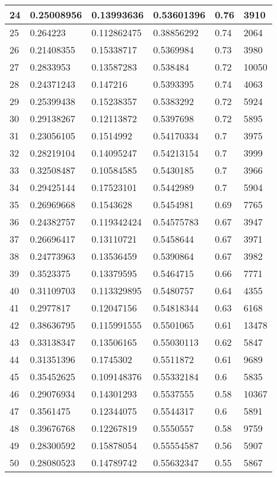 \begin{longtable}{|l|l|l|l|l|l|}
24 & 0.25008956 & 0.13993636 & 0.53601396 & 0.76 & 3910 \\ \hline 
25 & 0.264223 & 0.112862475 & 0.38856292 & 0.74 & 2064 \\ \hline 
26 & 0.21408355 & 0.15338717 & 0.5369984 & 0.73 & 3980 \\ \hline 
27 & 0.2833953 & 0.13587283 & 0.538484 & 0.72 & 10050 \\ \hline 
28 & 0.24371243 & 0.147216 & 0.5393395 & 0.74 & 4063 \\ \hline 
29 & 0.25399438 & 0.15238357 & 0.5383292 & 0.72 & 5924 \\ \hline 
30 & 0.29138267 & 0.12113872 & 0.5397698 & 0.72 & 5895 \\ \hline 
31 & 0.23056105 & 0.1514992 & 0.54170334 & 0.7 & 3975 \\ \hline 
32 & 0.28219104 & 0.14095247 & 0.54213154 & 0.7 & 3999 \\ \hline 
33 & 0.32508487 & 0.10584585 & 0.5430185 & 0.7 & 3966 \\ \hline 
34 & 0.29425144 & 0.17523101 & 0.5442989 & 0.7 & 5904 \\ \hline 
35 & 0.26969668 & 0.1543628 & 0.5454981 & 0.69 & 7765 \\ \hline 
36 & 0.24382757 & 0.119342424 & 0.54575783 & 0.67 & 3947 \\ \hline 
37 & 0.26696417 & 0.13110721 & 0.5458644 & 0.67 & 3971 \\ \hline 
38 & 0.24773963 & 0.13536459 & 0.5390864 & 0.67 & 3982 \\ \hline 
39 & 0.3523375 & 0.13379595 & 0.5464715 & 0.66 & 7771 \\ \hline 
40 & 0.31109703 & 0.113329895 & 0.5480757 & 0.64 & 4355 \\ \hline 
41 & 0.2977817 & 0.12047156 & 0.54818344 & 0.63 & 6168 \\ \hline 
42 & 0.38636795 & 0.115991555 & 0.5501065 & 0.61 & 13478 \\ \hline 
43 & 0.33138347 & 0.13506165 & 0.55030113 & 0.62 & 5847 \\ \hline 
44 & 0.31351396 & 0.1745302 & 0.5511872 & 0.61 & 9689 \\ \hline 
45 & 0.35452625 & 0.109148376 & 0.55332184 & 0.6 & 5835 \\ \hline 
46 & 0.29076934 & 0.14301293 & 0.5537555 & 0.58 & 10367 \\ \hline 
47 & 0.3561475 & 0.12344075 & 0.5544317 & 0.6 & 5891 \\ \hline 
48 & 0.39676768 & 0.12267819 & 0.5550557 & 0.58 & 9759 \\ \hline 
49 & 0.28300592 & 0.15878054 & 0.55554587 & 0.56 & 5907 \\ \hline 
50 & 0.28080523 & 0.14789742 & 0.55632347 & 0.55 & 5867 \\ \hline 
\end{longtable}